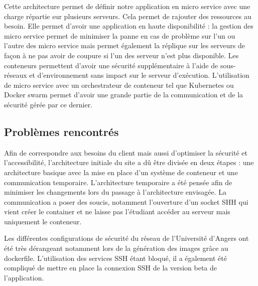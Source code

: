 \par Cette architecture permet de définir notre application en micro service avec une charge répartie sur plusieurs serveurs. Cela permet de rajouter des ressources au besoin. Elle permet d’avoir une application en haute disponibilité : la gestion des micro service permet de minimiser la panne en cas de problème sur l’un ou l’autre des micro service mais permet également la réplique sur les serveurs de façon à ne pas avoir de coupure si l’un des serveur n’est plus disponible. Les conteneurs permettent d’avoir une sécurité supplémentaire à l’aide de sous-réseaux et d’environnement sans impact sur le serveur d’exécution. L’utilisation de micro service avec un orchestrateur de \gls{conteneur} tel que Kubernetes ou Docker swarm permet d’avoir une grande partie de la communication et de la sécurité gérée par ce dernier.   

\subsection{Problèmes rencontrés} 

\par Afin de correspondre aux besoins du client mais aussi d’optimiser la sécurité et l'accessibilité, l’architecture initiale du site a dû être divisée en deux étapes : une architecture basique avec la mise en place d’un système de conteneur et une communication temporaire. L’architecture temporaire a été pensée afin de minimiser les changements lors du passage à l’architecture envisagée. La communication a poser des soucis, notamment l’ouverture d’un socket SHH qui vient créer le container et ne laisse pas l’étudiant accéder au serveur mais uniquement le conteneur.

\par Les différentes configurations de sécurité du réseau de l’Université d’Angers ont été très dérangeant notamment lors de la génération des images grâce au \gls{dockerfile}. L’utilisation des services SSH étant bloqué, il a également été compliqué de mettre en place la connexion SSH de la version beta de l’application. 